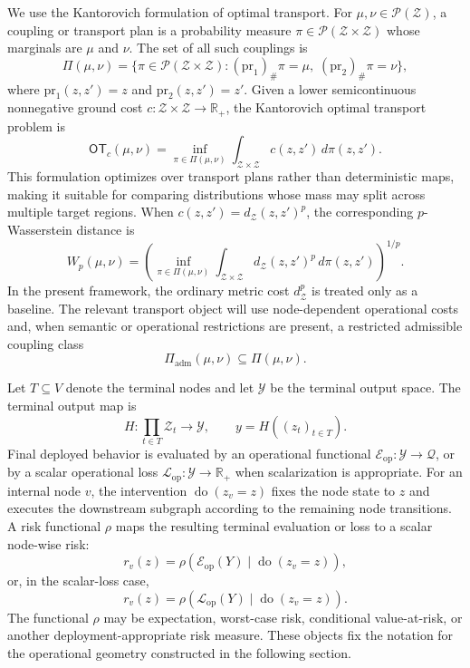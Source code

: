 \documentclass[10pt,twocolumn]{article}
\begin{document}
We use the Kantorovich formulation of optimal transport. For $\mu,\nu\in\mathcal{P}(\mathcal{Z})$, a coupling or transport plan is a probability measure $\pi\in\mathcal{P}(\mathcal{Z}\times\mathcal{Z})$ whose marginals are $\mu$ and $\nu$. The set of all such couplings is
\[
\Pi(\mu,\nu)
=
\{\pi\in\mathcal{P}(\mathcal{Z}\times\mathcal{Z}):(\mathrm{pr}_1)_{\#}\pi=\mu,\;(\mathrm{pr}_2)_{\#}\pi=\nu\},
\]
where $\mathrm{pr}_1(z,z')=z$ and $\mathrm{pr}_2(z,z')=z'$. Given a lower semicontinuous nonnegative ground cost $c:\mathcal{Z}\times\mathcal{Z}\rightarrow\mathbb{R}_{+}$, the Kantorovich optimal transport problem is
\[
\mathsf{OT}_c(\mu,\nu)
=
\inf_{\pi\in\Pi(\mu,\nu)}
\int_{\mathcal{Z}\times\mathcal{Z}} c(z,z')\,d\pi(z,z').
\]
This formulation optimizes over transport plans rather than deterministic maps, making it suitable for comparing distributions whose mass may split across multiple target regions. When $c(z,z')=d_{\mathcal{Z}}(z,z')^p$, the corresponding $p$-Wasserstein distance is
\[
W_p(\mu,\nu)
=
\left(
\inf_{\pi\in\Pi(\mu,\nu)}
\int_{\mathcal{Z}\times\mathcal{Z}}d_{\mathcal{Z}}(z,z')^p\,d\pi(z,z')
\right)^{1/p}.
\]
In the present framework, the ordinary metric cost $d_{\mathcal{Z}}^p$ is treated only as a baseline. The relevant transport object will use node-dependent operational costs and, when semantic or operational restrictions are present, a restricted admissible coupling class
\[
\Pi_{\mathrm{adm}}(\mu,\nu)\subseteq\Pi(\mu,\nu).
\]

Let $T\subseteq V$ denote the terminal nodes and let $\mathcal{Y}$ be the terminal output space. The terminal output map is
\[
H:\prod_{t\in T}\mathcal{Z}_t\rightarrow\mathcal{Y},
\qquad
y=H((z_t)_{t\in T}).
\]
Final deployed behavior is evaluated by an operational functional $\mathcal{E}_{\mathrm{op}}:\mathcal{Y}\rightarrow\mathcal{Q}$, or by a scalar operational loss $\mathcal{L}_{\mathrm{op}}:\mathcal{Y}\rightarrow\mathbb{R}_{+}$ when scalarization is appropriate. For an internal node $v$, the intervention $\operatorname{do}(z_v=z)$ fixes the node state to $z$ and executes the downstream subgraph according to the remaining node transitions. A risk functional $\rho$ maps the resulting terminal evaluation or loss to a scalar node-wise risk:
\[
r_v(z)=\rho\left(\mathcal{E}_{\mathrm{op}}(Y)\mid \operatorname{do}(z_v=z)\right),
\]
or, in the scalar-loss case,
\[
r_v(z)=\rho\left(\mathcal{L}_{\mathrm{op}}(Y)\mid \operatorname{do}(z_v=z)\right).
\]
The functional $\rho$ may be expectation, worst-case risk, conditional value-at-risk, or another deployment-appropriate risk measure. These objects fix the notation for the operational geometry constructed in the following section.
\end{document}

